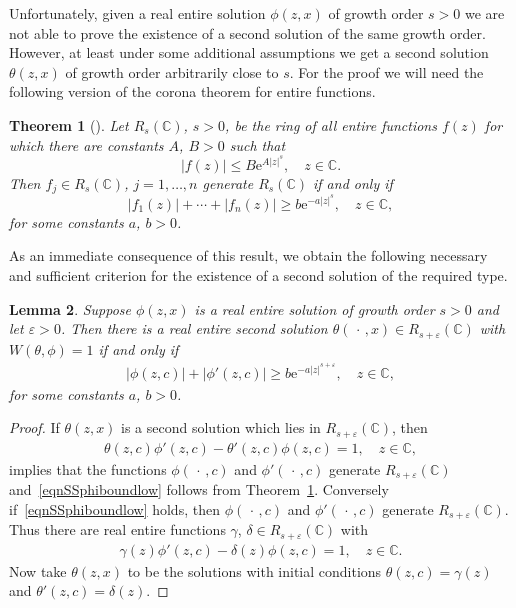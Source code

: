 \documentclass{amsart}
\newtheorem{theorem}{Theorem}[section]
\newtheorem{lemma}[theorem]{Lemma}
\numberwithin{equation}{section}
\begin{document}
Unfortunately, given a real entire solution $\phi(z,x)$ of growth order $s>0$ we are not able to prove the existence of a second solution of the same growth order.
However, at least under some additional assumptions we get a second solution $\theta(z,x)$ of growth order arbitrarily close to $s$.
For the proof we will need the following version of the corona theorem for entire functions.

\begin{theorem}[\cite{hor}]\label{thm:cor}
Let $R_s({{\mathbb C}})$, $s> 0$, be the ring of all entire functions $f(z)$ for which there are constants $A$, $B >0$ such that
\begin{equation}
|f(z)| \le B {\mathrm{e}}^{A |z|^s}, \quad z\in{{\mathbb C}}.
\end{equation}
Then $f_j\in R_s({{\mathbb C}})$, $j=1,\dots,n$ generate $R_s({{\mathbb C}})$ if and only if
\begin{equation}
|f_1(z)| + \cdots + |f_n(z)| \ge b {\mathrm{e}}^{-a |z|^s}, \quad z\in{{\mathbb C}},
\end{equation}
for some constants $a$, $b>0$.
\end{theorem}

As an immediate consequence of this result, we obtain the following necessary and sufficient criterion
for the existence of a second solution of the required type.

\begin{lemma}
Suppose $\phi(z,x)$ is a real entire solution of growth order $s>0$ and let ${\varepsilon}>0$. 
Then there is a real entire second solution $\theta(\,\cdot\,,x)\in R_{s+{\varepsilon}}({{\mathbb C}})$ with $W(\theta,\phi)=1$ if and only if 
\begin{align}\label{eqnSSphiboundlow}
   |\phi(z,c)| + |\phi'(z,c)| \geq b {\mathrm{e}}^{-a|z|^{s+{\varepsilon}}}, \quad z\in{{\mathbb C}},
\end{align}
for some constants $a$, $b>0$.
\end{lemma}

\begin{proof}
If $\theta(z,x)$ is a second solution which lies in $R_{s+{\varepsilon}}({{\mathbb C}})$, then
\begin{align*}
   \theta(z,c) \phi'(z,c) - \theta'(z,c) \phi(z,c) = 1, \quad z\in{{\mathbb C}},
\end{align*}
implies that the functions $\phi(\,\cdot\,,c)$ and $\phi'(\,\cdot\,,c)$ generate $R_{s+{\varepsilon}}({{\mathbb C}})$ and~\eqref{eqnSSphiboundlow} follows from Theorem~\ref{thm:cor}.
Conversely if~\eqref{eqnSSphiboundlow} holds, then $\phi(\,\cdot\,,c)$ and $\phi'(\,\cdot\,,c)$ generate $R_{s+{\varepsilon}}({{\mathbb C}})$. 
Thus there are real entire functions $\gamma$, $\delta\in R_{s+{\varepsilon}}({{\mathbb C}})$ with
\begin{align*}
   \gamma(z) \phi'(z,c) - \delta(z) \phi(z,c) = 1, \quad z\in{{\mathbb C}}.
\end{align*}
Now take $\theta(z,x)$  to be the solutions with initial conditions $\theta(z,c)=\gamma(z)$ and $\theta'(z,c)=\delta(z)$. 
\end{proof}
\end{document}
